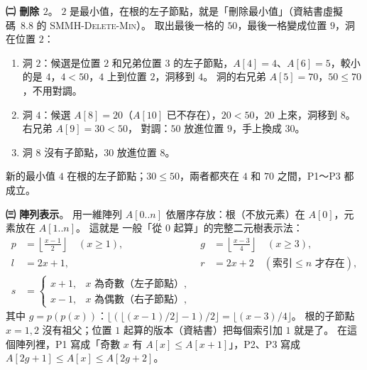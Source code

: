 \begin{pastsoln}
\textbf{㈡ 刪除 $2$}。 $2$ 是最小值，在根的左子節點，就是「刪除最小值」（資結書虛擬碼~8.8 的
\textsc{SMMH-Delete-Min}）。 取出最後一格的 $50$，最後一格變成位置 $9$，洞在位置 $2$：
\begin{enumerate}
\item 洞 $2$：候選是位置 $2$ 和兄弟位置 $3$ 的左子節點，$A[4] = 4$、$A[6] = 5$，較小的是 $4$，$4 < 50$，$4$
上到位置 $2$，洞移到 $4$。 洞的右兄弟 $A[5] = 70$，$50 \le 70$，不用對調。
\item 洞 $4$：候選 $A[8] = 20$（$A[10]$ 已不存在），$20 < 50$，$20$ 上來，洞移到 $8$。 右兄弟 $A[9] = 30 < 50$，
對調：$50$ 放進位置 $9$，手上換成 $30$。
\item 洞 $8$ 沒有子節點，$30$ 放進位置 $8$。
\end{enumerate}
\begin{center}
\end{center}
新的最小值 $4$ 在根的左子節點；$30 \le 50$，兩者都夾在 $4$ 和 $70$ 之間，P1～P3 都成立。

\textbf{㈢ 陣列表示}。 用一維陣列 $A[0..n]$ 依層序存放：根（不放元素）在 $A[0]$，元素放在 $A[1..n]$。 這就是
一般「從 $0$ 起算」的完整二元樹表示法：
\[
\begin{aligned}
p &= \left\lfloor \frac{x - 1}{2} \right\rfloor \quad (x \ge 1), &
g &= \left\lfloor \frac{x - 3}{4} \right\rfloor \quad (x \ge 3), \\
l &= 2x + 1, &
r &= 2x + 2 \quad (\text{索引} \le n \text{ 才存在}), \\
s &= \begin{cases} x + 1, & x \text{ 為奇數（左子節點）}, \\ x - 1, & x \text{ 為偶數（右子節點）}, \end{cases} & &
\end{aligned}
\]
其中 $g = p(p(x))$：$\lfloor(\lfloor(x-1)/2\rfloor - 1)/2\rfloor = \lfloor (x - 3)/4 \rfloor$。 根的子節點
$x = 1, 2$ 沒有祖父；位置 $1$ 起算的版本（資結書）把每個索引加 $1$ 就是了。 在這個陣列裡，P1 寫成「奇數 $x$
有 $A[x] \le A[x + 1]$」，P2、P3 寫成 $A[2g + 1] \le A[x] \le A[2g + 2]$。


\end{pastsoln}
